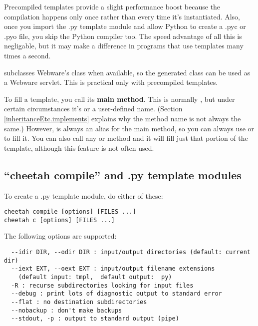 Precompiled templates provide a slight performance boost because the
compilation happens only once rather than every time it's instantiated.
Also, once you import the .py template module and allow Python to create a 
.pyc or .pyo file, you skip the Python compiler too.  The speed advantage
of all this is negligable, but it may make a difference in programs that
use templates many times a second.

 subclasses Webware's  class when available,
so the generated class can be used as a Webware servlet.  This is practical
only with precompiled templates.

To fill a template, you call its {\bf main method}.  This is normally 
, but under certain circumstances it's  or
a user-defined name.  (Section \ref{inheritanceEtc.implements} explains why
the method name is not always the same.)  However,  is
always an alias for the main method, so you can always use
 or  to fill it.
You can also call any  or  method and it will fill
just that portion of the template, although this feature is not often used.


\subsection{``cheetah compile'' and .py template modules}
\label{howWorks.cheetah-compile}

To create a .py template module, do either of these:

\begin{verbatim}
cheetah compile [options] [FILES ...]
cheetah c [options] [FILES ...]
\end{verbatim}

The following options are supported:
\begin{verbatim}
  --idir DIR, --odir DIR : input/output directories (default: current dir)
  --iext EXT, --oext EXT : input/output filename extensions
    (default input: tmpl,  default output:  py)
  -R : recurse subdirectories looking for input files
  --debug : print lots of diagnostic output to standard error
  --flat : no destination subdirectories
  --nobackup : don't make backups
  --stdout, -p : output to standard output (pipe)
\end{verbatim}

